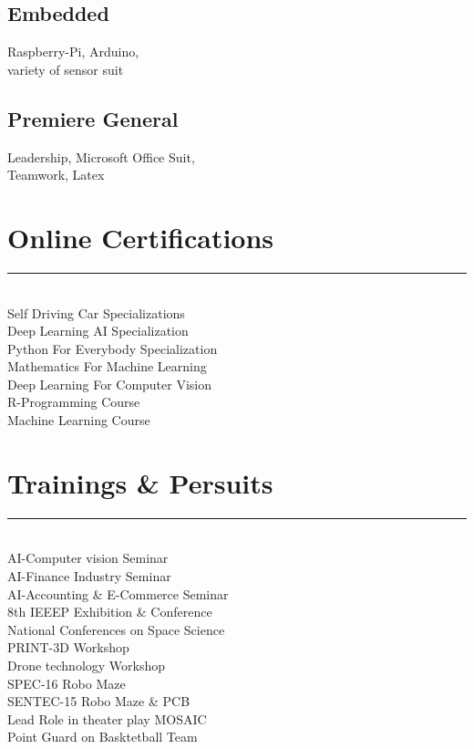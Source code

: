 \documentclass[]{ShumailaAhmed-Resume}
\begin{document}
\begin{minipage}[t]{0.33\textwidth}
\subsection{Embedded}
Raspberry-Pi, Arduino, \\
variety of sensor suit
\vspace{6pt}
\subsection{Premiere General}
Leadership, Microsoft Office Suit,\\
Teamwork, Latex
\sectionsep
\section{Online Certifications}
\noindent\rule{5cm}{0.4pt}\\
Self Driving Car Specializations \\
Deep Learning AI Specialization\\
Python For Everybody Specialization\\
Mathematics For Machine Learning\\
Deep Learning For Computer Vision\\
R-Programming Course\\
Machine Learning Course\\
\sectionsep
\section{Trainings \& Persuits } 
\noindent\rule{5cm}{0.4pt}\\
AI-Computer vision Seminar\\
AI-Finance Industry Seminar\\
AI-Accounting & E-Commerce Seminar\\
8th IEEEP Exhibition \& Conference\\
National Conferences on Space Science\\
PRINT-3D Workshop\\
Drone technology Workshop\\
SPEC-16 Robo Maze \\
SENTEC-15 Robo Maze & PCB \\
Lead Role in theater play MOSAIC\\
Point Guard on Basktetball Team
\sectionsep
%
%

\end{minipage} 
\end{document}
